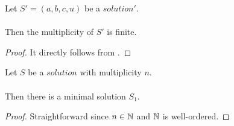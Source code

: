 \begin{lemma}
    \label{lmm:Solution1.multiplicity_lambda_c_finite}
    \leanok
    Let $S'=(a, b, c, u)$ be a $solution'$. \\\\
    Then the multiplicity of $S'$ is finite.
\end{lemma}
\begin{proof}
    \leanok
    It directly follows from .
\end{proof}

\begin{lemma}
    \label{lmm:exists_minimal}
    \leanok
    Let $S$ be a $solution$ with multiplicity $n$. \\\\
    Then there is a minimal solution $S_1$.
\end{lemma}
\begin{proof}
    \leanok
    Straightforward since $n \in \mathbb{N}$ and $\mathbb{N}$ is well-ordered.
\end{proof}

